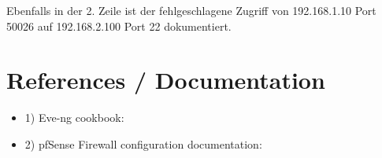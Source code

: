 \documentclass{article}
\begin{document}
Ebenfalls in der 2. Zeile ist der fehlgeschlagene Zugriff von 192.168.1.10 Port 50026 
auf 192.168.2.100 Port 22 dokumentiert.

\section{References / Documentation}

\begin{itemize}
    \item 1) Eve-ng cookbook:  
    \item 2) pfSense Firewall configuration documentation: 
\end{itemize}
\end{document}
